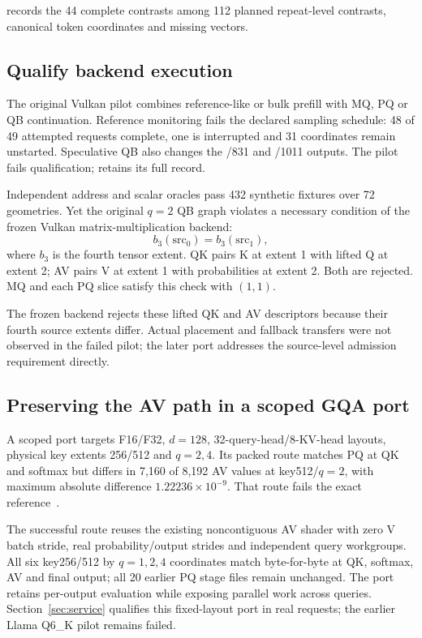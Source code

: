  records the 44 complete contrasts among 112 planned repeat-level contrasts, canonical token coordinates and missing vectors.

\subsection{Qualify backend execution}
\label{sec:backend}
The original Vulkan pilot combines reference-like or bulk prefill with MQ, PQ or QB continuation. Reference monitoring fails the declared sampling schedule: 48 of 49 attempted requests complete, one is interrupted and 31 coordinates remain unstarted. Speculative QB also changes the /831 and /1011 outputs. The pilot fails qualification;  retains its full record.

Independent address and scalar oracles pass 432 synthetic fixtures over 72 geometries. Yet the original $q=2$ QB graph violates a necessary condition of the frozen Vulkan matrix-multiplication backend:
\begin{equation}
b_3(\mathrm{src}_0)=b_3(\mathrm{src}_1),
\label{eq:backend}
\end{equation}
where $b_3$ is the fourth tensor extent. QK pairs K at extent 1 with lifted Q at extent 2; AV pairs V at extent 1 with probabilities at extent 2. Both are rejected. MQ and each PQ slice satisfy this check with $(1,1)$.

The frozen backend rejects these lifted QK and AV descriptors because their fourth source extents differ. Actual placement and fallback transfers were not observed in the failed pilot; the later port addresses the source-level admission requirement directly.

\subsection{Preserving the AV path in a scoped GQA port}
A scoped port targets F16/F32, $d=128$, 32-query-head/8-KV-head layouts, physical key extents 256/512 and $q=2,4$. Its packed route matches PQ at QK and softmax but differs in 7,160 of 8,192 AV values at key512/$q=2$, with maximum absolute difference $1.22236\times10^{-9}$. That route fails the exact reference~\cite{b570gqarecords}.

The successful route reuses the existing noncontiguous AV shader with zero V batch stride, real probability/output strides and independent query workgroups. All six key256/512 by $q=1,2,4$ coordinates match byte-for-byte at QK, softmax, AV and final output; all 20 earlier PQ stage files remain unchanged. The port retains per-output evaluation while exposing parallel work across queries. Section~\ref{sec:service} qualifies this fixed-layout port in real requests; the earlier Llama Q6\_K pilot remains failed.
